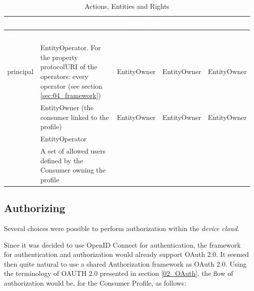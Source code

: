  \begin{table}[htpb]
 	\caption{Actions, Entities and Rights} 
 	\label{tab:access_control}
 	\begin{tabular}{|m{}|m{}|m{}|m{}|m{}|}
 		\hline
 		\cellcolor{Gray} & \multicolumn{4}{c}{\cellcolor{Gray}\textcolor{white}{\textbf{Actions}}}\\
 		\hline
 		\cellcolor{Gray}\textcolor{white}{\textbf{Entity}} 
 		&
 		\cellcolor{LightGray}{Read-Only}
 		&
 		\cellcolor{LightGray}{Read-Write}
 		&
 		\cellcolor{LightGray}{Create}
 		&
 		\cellcolor{LightGray}{Delete}
 		\\ \hline
 		
 		\cellcolor{LightGray}principal & \textbullet \quad EntityOperator. \linebreak \linebreak \textbullet \quad For the property protocolURI of the operators: every operator (see section \ref{sec:04_framework}) & EntityOwner & EntityOwner & EntityOwner
 		\\ \hline
 		\multirow{3}{*}{\cellcolor{LightGray}} & 
 		\multicolumn{1}{p{0.8\textwidth/9*2}|}{\textbullet \quad EntityOwner (the consumer linked to the profile)} & 
 		\multicolumn{1}{p{0.8\textwidth/9*2}|}{EntityOwner} &
 		\multicolumn{1}{p{0.8\textwidth/9*2}|}{EntityOwner} & 
 		\multicolumn{1}{p{0.8\textwidth/9*2}|}{EntityOwner} 
 		\\
 		\cellcolor{LightGray}consumer profile & 
 		\textbullet \quad EntityOperator & 
 		& 
 		& 
 		
 		\\
 		\cellcolor{LightGray} & 
 		\textbullet \quad A set of allowed users defined by the Consumer owning the profile &
 		& 
 		& 
 		
 		\\

 		\hline
 	\end{tabular}
 \end{table}


\subsection{Authorizing}
\label{03_consumer_profile_authorization}
Several choices were possible to perform authorization within the \emph{device cloud}.

Since it was decided to use OpenID Connect for authentication, the framework for authentication and authorization would already support OAuth 2.0. It seemed then quite natural to use a shared Authorization framework as OAuth 2.0. Using the terminology of OAUTH 2.0 presented in section \ref{02_OAuth}, the flow of authorization would be, for the Consumer Profile, as follows:

